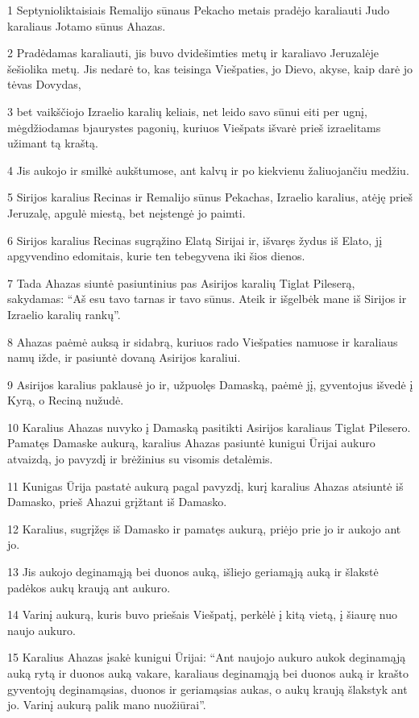 \par 1 Septynioliktaisiais Remalijo sūnaus Pekacho metais pradėjo karaliauti Judo karaliaus Jotamo sūnus Ahazas. 
\par 2 Pradėdamas karaliauti, jis buvo dvidešimties metų ir karaliavo Jeruzalėje šešiolika metų. Jis nedarė to, kas teisinga Viešpaties, jo Dievo, akyse, kaip darė jo tėvas Dovydas, 
\par 3 bet vaikščiojo Izraelio karalių keliais, net leido savo sūnui eiti per ugnį, mėgdžiodamas bjaurystes pagonių, kuriuos Viešpats išvarė prieš izraelitams užimant tą kraštą. 
\par 4 Jis aukojo ir smilkė aukštumose, ant kalvų ir po kiekvienu žaliuojančiu medžiu. 
\par 5 Sirijos karalius Recinas ir Remalijo sūnus Pekachas, Izraelio karalius, atėję prieš Jeruzalę, apgulė miestą, bet neįstengė jo paimti. 
\par 6 Sirijos karalius Recinas sugrąžino Elatą Sirijai ir, išvaręs žydus iš Elato, jį apgyvendino edomitais, kurie ten tebegyvena iki šios dienos. 
\par 7 Tada Ahazas siuntė pasiuntinius pas Asirijos karalių Tiglat Pileserą, sakydamas: “Aš esu tavo tarnas ir tavo sūnus. Ateik ir išgelbėk mane iš Sirijos ir Izraelio karalių rankų”. 
\par 8 Ahazas paėmė auksą ir sidabrą, kuriuos rado Viešpaties namuose ir karaliaus namų ižde, ir pasiuntė dovaną Asirijos karaliui. 
\par 9 Asirijos karalius paklausė jo ir, užpuolęs Damaską, paėmė jį, gyventojus išvedė į Kyrą, o Reciną nužudė. 
\par 10 Karalius Ahazas nuvyko į Damaską pasitikti Asirijos karaliaus Tiglat Pilesero. Pamatęs Damaske aukurą, karalius Ahazas pasiuntė kunigui Ūrijai aukuro atvaizdą, jo pavyzdį ir brėžinius su visomis detalėmis. 
\par 11 Kunigas Ūrija pastatė aukurą pagal pavyzdį, kurį karalius Ahazas atsiuntė iš Damasko, prieš Ahazui grįžtant iš Damasko. 
\par 12 Karalius, sugrįžęs iš Damasko ir pamatęs aukurą, priėjo prie jo ir aukojo ant jo. 
\par 13 Jis aukojo deginamąją bei duonos auką, išliejo geriamąją auką ir šlakstė padėkos aukų kraują ant aukuro. 
\par 14 Varinį aukurą, kuris buvo priešais Viešpatį, perkėlė į kitą vietą, į šiaurę nuo naujo aukuro. 
\par 15 Karalius Ahazas įsakė kunigui Ūrijai: “Ant naujojo aukuro aukok deginamąją auką rytą ir duonos auką vakare, karaliaus deginamąją bei duonos auką ir krašto gyventojų deginamąsias, duonos ir geriamąsias aukas, o aukų kraują šlakstyk ant jo. Varinį aukurą palik mano nuožiūrai”. 
